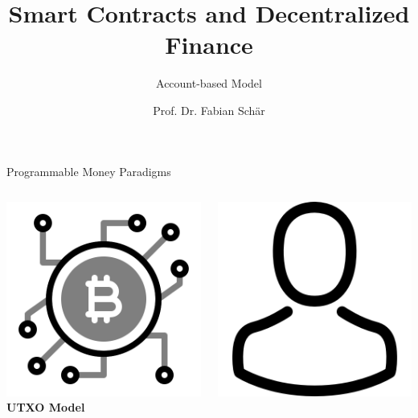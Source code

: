 \documentclass[handout]{beamer}
\title{Smart Contracts and Decentralized Finance}
\subtitle{Account-based Model}
\author{Prof. Dr. Fabian Schär}
\institute{University of Basel}
\begin{document}
\thispagestyle{empty}
\begin{frame}[noframenumbering]
	\titlepage
\end{frame}


\begin{frame}{Programmable Money Paradigms}
	\begin{columns}[T]
		\begin{column}{0.45\textwidth}
			\centering
			\includegraphics[scale=0.075]{../assets/images/bitcoin_network_symbol.png}\\
			\textbf{UTXO Model}
		\end{column}
		\begin{column}{0.45\textwidth}
			\centering
			\includegraphics[scale=0.1]{../assets/images/EOA.png}

\end{column}
\end{columns}
\end{frame}
\end{document}
